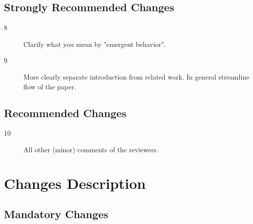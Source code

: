 \documentclass[11pt]{amsart}
\begin{document}
 \subsection{Strongly Recommended Changes}

 \begin{description}
 
 \item[8]
 Clarify what you mean by "emergent behavior".
 
 \item[9]
 More clearly separate introduction from related work. In general streamline flow of the paper.
 
 \end{description}
 
 \subsection{Recommended Changes}
 
  \begin{description}
  
 
 \item[10]
 All other (minor) comments of the reviewers.
 
 \end{description}


 
 \section{Changes Description}
 
 \subsection{Mandatory Changes}
\end{document}
